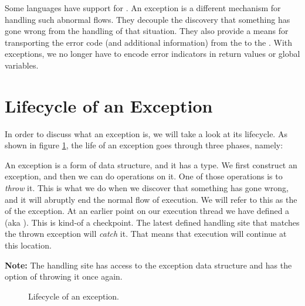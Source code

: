 Some languages have support for . An exception is a different mechanism for handling such abnormal flows. They decouple the discovery that something has gone wrong from the handling of that situation. They also provide a means for transporting the error code (and additional information) from the  to the . With exceptions, we no longer have to encode error indicators in return values or global variables.

\section{Lifecycle of an Exception}

In order to discuss what an exception is, we will take a look at its lifecycle. As shown in figure \ref{fig:exception:lifecycle}, the life of an exception goes through three phases, namely:
\begin{enumerate}
   An exception is a form of data structure, and it has a type. We first construct an exception, and then we can do operations on it.
   One of those operations is to \textsl{throw} it. This is what we do when we discover that something has gone wrong, and it will abruptly end the normal flow of execution. We will refer to this as the  of the exception.
   At an earlier point on our execution thread we have defined a  (aka ). This is kind-of a checkpoint. The latest defined handling site that matches the thrown exception will \textsl{catch} it. That means that execution will continue at this location.
\end{enumerate}
\textbf{Note:} The handling site has access to the exception data structure and has the option of throwing it once again.

\begin{figure}[tbp]
  
  \caption{Lifecycle of an exception.}
  \label{fig:exception:lifecycle}
\end{figure}

